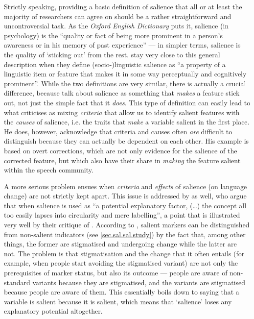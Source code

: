 Strictly speaking, providing a basic definition of salience that all or at least the majority of researchers can agree on should be a rather straightforward and uncontroversial task.
As the \emph{Oxford English Dictionary} puts it, salience (in psychology) is the ``quality or fact of being more prominent in a person's awareness or in his memory of past experience'' --- in simpler terms, salience is the quality of `sticking out' from the rest.
\textcite[81]{kerswillwilliams2002} stay very close to this general description when they define (socio-)linguistic salience as ``a property of a linguistic item or feature that makes it in some way perceptually and cognitively prominent''.
While the two definitions are very similar, there is actually a crucial difference, because \citeauthor{kerswillwilliams2002} talk about salience as something that \emph{makes} a feature stick out, not just the simple fact that it \emph{does}.
This type of definition can easily lead to what \textcite[cf.][9]{auer2014} criticises as mixing \emph{criteria} that allow us to identify salient features with the \emph{causes} of salience, i.e. the traits that \emph{make} a variable salient in the first place.
He does, however, acknowledge that criteria and causes often \emph{are} difficult to distinguish because they can actually be dependent on each other.
His example is based on overt corrections, which are not only evidence for the salience of the corrected feature, but which also have their share in \emph{making} the feature salient within the speech community.

A more serious problem ensues when \emph{criteria} and \emph{effects} of salience (on language change) are not strictly kept apart.
This issue is addressed by \textcite[82]{kerswillwilliams2002} as well, who argue that when salience is used as ``a potential explanatory factor, (\ldots) the concept all too easily lapses into circularity and mere labelling'', a point that is illustrated very well by their critique of \textcite{trudgill1986}.
According to \citeauthor{trudgill1986}, salient markers can be distinguished from non-salient indicators (see \ref{sec.sal.sal.study}) by the fact that, among other things, the former are stigmatised and undergoing change while the latter are not.
The problem is that stigmatisation and the change that it often entails (for example, when people start avoiding the stigmatised variant) are not only the prerequisites of marker status, but also its outcome --- people are aware of non-standard variants because they are stigmatised, and the variants are stigmatised because people are aware of them.
This essentially boils down to saying that a variable is salient because it is salient, which means that `salience' loses any explanatory potential altogether.

